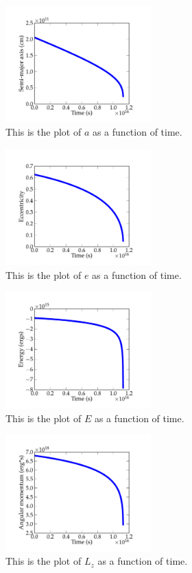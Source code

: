 \documentclass[11pt,letterpaper]{article}
\begin{document}
\begin{figure}[bth]
\centering
\includegraphics[width=0.5\textwidth]{billion_figs/semi-major_axis.pdf}
\caption{This is the plot of $a$ as a function of time.}
\label{fig:simpleplot2}
\end{figure}

\begin{figure}[bth]
\centering
\includegraphics[width=0.5\textwidth]{billion_figs/eccentricity.pdf}
\caption{This is the plot of $e$ as a function of time.}
\label{fig:simpleplot2}
\end{figure}

\begin{figure}[bth]
\centering
\includegraphics[width=0.5\textwidth]{billion_figs/energy.pdf}
\caption{This is the plot of $E$ as a function of time.}
\label{fig:simpleplot2}
\end{figure}

\begin{figure}[bth]
\centering
\includegraphics[width=0.5\textwidth]{billion_figs/angular_momentum.pdf}
\caption{This is the plot of $L_z$ as a function of time.}
\label{fig:simpleplot2}
\end{figure}
\end{document}
